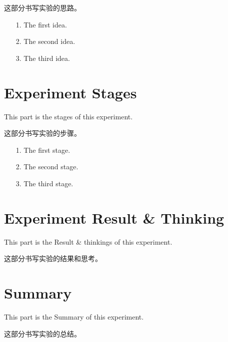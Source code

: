 \documentclass[UTF8,12pt,a4paper]{report}
\begin{document}
	
	这部分书写实验的思路。
	
	\begin{enumerate}
	\item[1.] The first idea.
	\item[2.] The second idea.
	\item[3.] The third idea.
	\end{enumerate}
	
	\section{Experiment Stages}
	This part is the stages of this experiment.
	
	
	这部分书写实验的步骤。
	
	\begin{enumerate}
	\item[1.] The first stage.
	\item[2.] The second stage.
	\item[3.] The third stage.
	\end{enumerate}
	
	
	\section{Experiment Result \& Thinking}
	This part is the Result \& thinkings of this experiment.
	
	
	这部分书写实验的结果和思考。
	
	
	\section{Summary}
	This part is the Summary of this experiment.
	
	
	这部分书写实验的总结。
\end{document}
